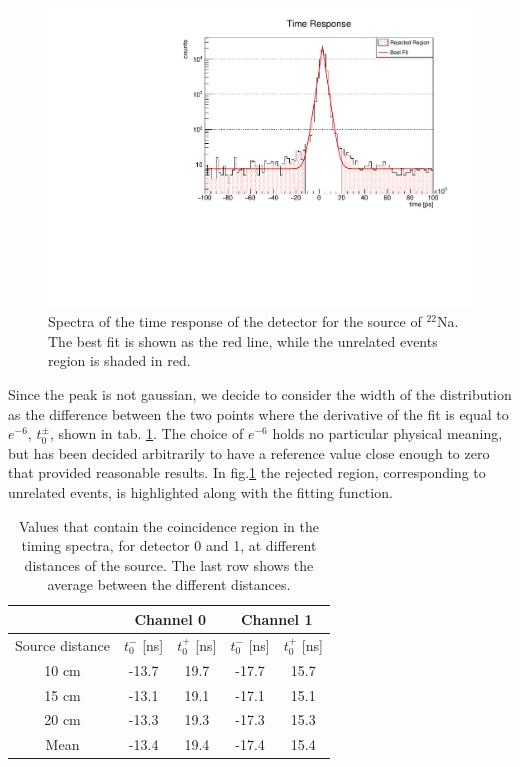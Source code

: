 \begin{figure}[H]
    \centering
    \includegraphics[scale=0.5]{Images/analysis/timing/time_response.pdf}
    \caption{Spectra of the time response of the detector for the source of $^{22}$Na. The best fit is shown as the red line, while the unrelated events region is shaded in red.}
    \label{fig:timing}
\end{figure}
 
Since the  peak is not gaussian, we decide to consider the width of the distribution as the difference between the two points where the derivative of the fit is equal to $e^{-6}$, $t_{0}^{\pm}$, shown in tab. \ref{table:t0}. The choice of $e^{-6}$ holds no particular physical meaning, but has been decided arbitrarily to have a reference value close enough to zero that provided reasonable results. In fig.\ref{fig:timing} the rejected region, corresponding to unrelated events, is highlighted along with the fitting function.

\begin{table}[ht]
    \centering
    \begin{tabular}{|c|c|c|c|c|}
    \hline
     & \multicolumn{2}{|c|}{Channel 0} & \multicolumn{2}{|c|}{Channel 1}\\
    \hline
    Source distance& $t_{0}^{-}$ [ns] & $t_{0}^{+}$ [ns] & $t_{0}^{-}$ [ns] & $t_{0}^{+}$ [ns] \\
    \hline
    10 cm& -13.7 & 19.7 & -17.7 & 15.7 \\
    15 cm& -13.1 & 19.1 & -17.1 & 15.1 \\
    20 cm& -13.3 & 19.3 & -17.3 & 15.3 \\
    Mean&  -13.4& 19.4& -17.4 & 15.4 \\
    \hline
    \end{tabular}
    \caption{Values that contain the coincidence region in the timing spectra, for detector 0 and 1, at different distances of the source. The last row shows the average between the different distances.}
    \label{table:t0}
\end{table}

